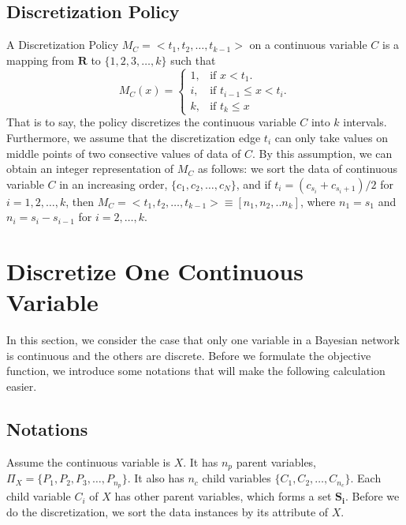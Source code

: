 \subsection{Discretization Policy}
\label{Disc_p}
A Discretization Policy $M_C = < t_1,t_2, \ldots, t_{k-1} >$ on a continuous variable $C$ is a mapping from $\boldsymbol{R}$ to $\{1,2,3,\ldots,k \}$ such that
\begin{equation}
  M_C (x)=\begin{cases}
    1, & \text{if $x<t_1$}.\\
    i, & \text{if $t_{i-1} \leq x < t_i$}.\\
    k, & \text{if $t_k \leq x$}
  \end{cases}
\end{equation}
That is to say, the policy discretizes the continuous variable $C$ into $k$ intervals. Furthermore, we assume that the discretization edge $t_i$ can only take values on middle points of two consective values of data of $C$. By this assumption, we can obtain an integer representation of $M_C$ as follows: 
we sort the data of continuous variable $C$ in an increasing order, $\{ c_1,c_2,\ldots,c_N \}$, and if $t_i = (c_{s_{i}} + c_{s_{i}+1})/2$ for $i=1,2,\ldots,k$, then $M_C = < t_1,t_2, \ldots, t_{k-1} > \equiv [n_1,n_2,..n_k]$, where $n_1 = s_1$ and $n_i = s_{i} - s_{i-1}$ for $i = 2,\ldots,k$.\\

\section{Discretize One Continuous Variable}
\label{one-conti}
In this section, we consider the case that only one variable in a Bayesian network is continuous and the others are discrete. Before we formulate the objective function, we introduce some notations that will make the following calculation easier.
\subsection{Notations}
\label{Notation}
Assume the continuous variable is $X$. It has $n_p$ parent variables, $\Pi_X = \{ P_1, P_2, P_3,\ldots,P_{n_p}\}$. It also has $n_c$ child variables $\{ C_1, C_2,\ldots,C_{n_c}\}$. Each child variable $C_i$ of $X$ has other parent variables, which forms a set $\boldsymbol{S_i}$. Before we do the discretization, we sort the data instances by its attribute of $X$.

